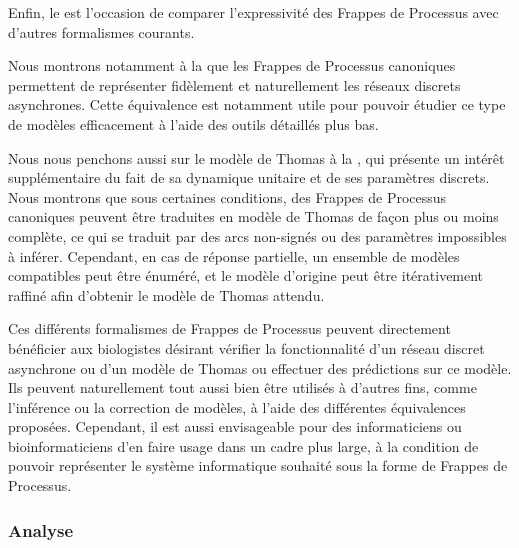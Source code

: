 \myskip

Enfin, le  est l'occasion de comparer l'expressivité des
Frappes de Processus avec d'autres formalismes courants.

Nous montrons notamment à la  que les Frappes de Processus canoniques
permettent de représenter fidèlement et naturellement les réseaux discrets asynchrones.
Cette équivalence est notamment utile pour pouvoir étudier ce type de modèles
efficacement à l'aide des outils détaillés plus bas.

Nous nous penchons aussi sur le modèle de Thomas à la ,
qui présente un intérêt supplémentaire du fait de sa dynamique unitaire
et de ses paramètres discrets.
Nous montrons que sous certaines conditions, des Frappes de Processus canoniques
peuvent être traduites en modèle de Thomas de façon plus ou moins complète,
ce qui se traduit par des arcs non-signés ou des paramètres impossibles à inférer.
Cependant, en cas de réponse partielle,
un ensemble de modèles compatibles peut être énuméré,
et le modèle d'origine peut être itérativement raffiné afin d'obtenir
le modèle de Thomas attendu.


\myskip

Ces différents formalismes de Frappes de Processus
peuvent directement bénéficier aux biologistes désirant
vérifier la fonctionnalité d'un réseau discret asynchrone ou d'un modèle de Thomas
ou effectuer des prédictions sur ce modèle.
Ils peuvent naturellement tout aussi bien être utilisés à d'autres fins,
comme l'inférence ou la correction de modèles, à l'aide des différentes équivalences proposées.
Cependant, il est aussi envisageable pour des informaticiens ou bioinformaticiens
d'en faire usage dans un cadre
plus large, à la condition de pouvoir représenter le système informatique souhaité
sous la forme de Frappes de Processus.



\subsubsection*{Analyse}

